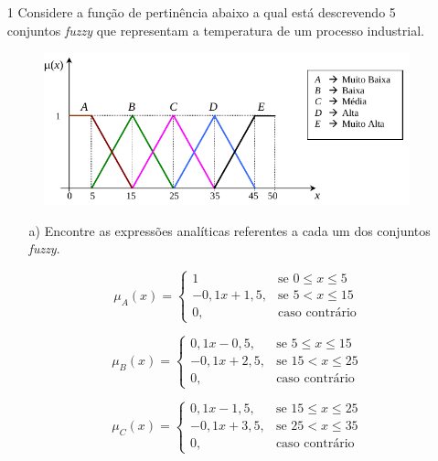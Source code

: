 \documentclass{report}
\begin{document}
\newpage

\begin{enumerate}

\item[1]  Considere a função de pertinência abaixo a qual está descrevendo 5 conjuntos \emph{fuzzy} que
representam a temperatura de um processo industrial.

\begin{figure}[hptb]
\centering
\includegraphics[scale=1]{plot1.png}
\end{figure}


\begin{enumerate}

\item[a)] Encontre as expressões analíticas referentes a cada um dos conjuntos \emph{fuzzy}.

\begin{equation*}
\mu_A (x) = 
\begin{cases} 
1           & \text{se $0 \leq x \leq 5$}
\\
-0,1x+1,5,  & \text{se $5 < x  \leq 15$}
\\
0,          & \text{caso contrário}
\end{cases}
\end{equation*}

\begin{equation*}
\mu_B (x) = 
\begin{cases} 
0,1x-0,5,  & \text{se $5 \leq x  \leq 15$}
\\
-0,1x+2,5,  & \text{se $15 < x  \leq 25$}
\\
0,          & \text{caso contrário}
\end{cases}
\end{equation*}

\begin{equation*}
\mu_C (x) = 
\begin{cases} 
0,1x-1,5,  & \text{se $15 \leq x  \leq 25$}
\\
-0,1x+3,5,  & \text{se $25 < x  \leq 35$}
\\
0,          & \text{caso contrário}
\end{cases}
\end{equation*}


\end{enumerate}
\end{enumerate}
\end{document}

